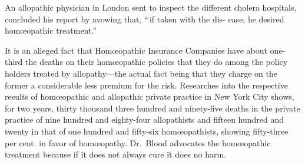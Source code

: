 \documentclass[10pt]{article}
\begin{document}
\begin{multicols}{3}
An allopathic physician in London sent to inspect the different cholera\linebreak
hospitals, concluded his report by avowing that, ``\,if taken with the dis-\linebreak
ease, he desired hom{\oe}opathic treatment.''

It is an alleged fact that Hom{\oe}opathic Insurance Companies have\linebreak
about one-third the deaths on their hom{\oe}opathic policies that they do\linebreak
among the policy holders treated by allopathy---the actual fact being that\linebreak
they charge on the former a considerable less premium for the risk.\linebreak
Researches into the respective results of hom{\oe}opathic and allopathic private\linebreak
practice in New York City shows, for two years, thirty thousand three\linebreak
hundred and ninety-five deaths in the private practice of nine hundred and\linebreak
eighty-four allopathists and fifteen hundred and twenty in that of one\linebreak
hundred and fifty-six hom{\oe}opathists, showing fifty-three per cent. in favor\linebreak
of hom{\oe}opathy. Dr.~Blood advocates the hom{\oe}opathic treatment because\linebreak
if it does not always cure it does no harm.


\end{multicols}
\end{document}
